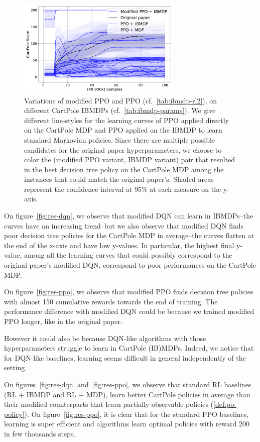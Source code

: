 \begin{figure}
    \centering
    \includegraphics[width=0.7\textwidth]{images/images_part1/ppo.pdf}
    \caption{Variations of modified PPO and PPO (cf.~\ref{tab:ibmdp-rl2}), on different CartPole IBMDPs (cf.~\ref{tab:ibmdp-params}). We give different line-styles for the learning curves of PPO applied directly on the CartPole MDP and PPO applied on the IBMDP to learn standard Markovian policies.
    Since there are multiple possible candidates for the original paper hyperparameters, we choose to color the (modified PPO variant, IBMDP variant) pair that resulted in the best decision tree policy on the CartPole MDP among the instances that could match the original paper's.
    Shaded areas represent the confidence interval at 95\% at each measure on the y-axis.}
\end{figure}\label{fig:res-ppo}

On figure~\ref{fig:res-dqn}, we observe that modified DQN can learn in IBMDPs--the curves have an increasing trend--but we also observe that modified DQN finds poor decision tree policies for the CartPole MDP in average--the curves flatten at the end of the x-axis and have low y-values.
In particular, the highest final y-value, among all the learning curves that could possibly correspond to the original paper's modified DQN, correspond to poor performances on the CartPole MDP.

On figure~\ref{fig:res-ppo}, we observe that modified PPO finds decision tree policies with almost 150 cumulative rewards towards the end of training.
The performance difference with modified DQN could be because we trained modified PPO longer, like in the original paper.

However it could also be because DQN-like algorithms with those hyperparameters struggle to learn in CartPole (IB)MDPs.
Indeed, we notice that for DQN-like baselines, learning seems difficult in general independently of the setting.

On figures~\ref{fig:res-dqn} and~\ref{fig:res-ppo}, we observe that standard RL baselines (RL + IBMDP and RL + MDP), learn better CartPole policies in average than their modified counterparts that learn partially observable policies (\ref{def:po-policy}). 
On figure~\ref{fig:res-ppo}, it is clear that for the standard PPO baselines, learning is super efficient and algorithms learn optimal policies with reward 200 in few thousands steps.

